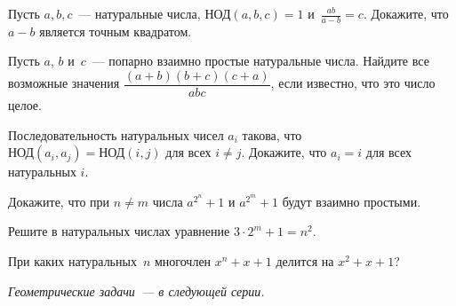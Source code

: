 \begin{problems}

\item
Пусть $a, b, c$~--- натуральные числа, $\text{НОД}(a, b, c) = 1$
и~$\frac{a b}{a - b} = c$.
Докажите, что $a - b$ является точным квадратом.

\item
Пусть $a$, $b$ и~$c$~--- попарно взаимно простые натуральные числа.
Найдите все возможные значения
$\dfrac{(a+b)(b+c)(c+a)}{abc}$, если известно, что это число целое.

\item
Последовательность натуральных чисел $a_{i}$ такова, что
$\text{НОД}(a_{i}, a_{j}) = \text{НОД}(i, j)$ для всех $i \neq j$.
Докажите, что $a_{i} = i$  для всех натуральных $i$.

\item
Докажите, что при $n \neq m$ числа $a^{2^{n}} + 1$ и $a^{2^{m}} + 1$ будут
взаимно простыми.

\item
Решите в натуральных числах уравнение $3 \cdot 2^m + 1 = n^2$.

\item
При каких натуральных~$n$ многочлен $x^{n} + x + 1$ делится на $x^{2} + x + 1$?

\end{problems}

\emph{Геометрические задачи — в следующей серии.}

